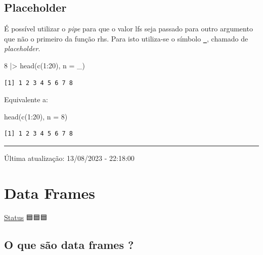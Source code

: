 \documentclass[
  letterpaper,
  DIV=11,
  numbers=noendperiod]{scrreprt}
\newenvironment{Shaded}{\begin{snugshade}}{\end{snugshade}}
\newcommand{\AttributeTok}[1]{\textcolor[rgb]{0.40,0.45,0.13}{#1}}
\newcommand{\DecValTok}[1]{\textcolor[rgb]{0.68,0.00,0.00}{#1}}
\newcommand{\FunctionTok}[1]{\textcolor[rgb]{0.28,0.35,0.67}{#1}}
\newcommand{\NormalTok}[1]{\textcolor[rgb]{0.00,0.23,0.31}{#1}}
\newcommand{\SpecialCharTok}[1]{\textcolor[rgb]{0.37,0.37,0.37}{#1}}
\begin{document}
\hypertarget{placeholder}{%
\section{Placeholder}\label{placeholder}}

É possível utilizar o \emph{pipe} para que o valor lfs seja passado para
outro argumento que não o primeiro da função rhs. Para isto utiliza-se o
símbolo \textbf{\texttt{\_}}, chamado de \emph{placeholder}.

\begin{Shaded}
\begin{Highlighting}[]
\DecValTok{8} \SpecialCharTok{|\textgreater{}} \FunctionTok{head}\NormalTok{(}\FunctionTok{c}\NormalTok{(}\DecValTok{1}\SpecialCharTok{:}\DecValTok{20}\NormalTok{), }\AttributeTok{n =}\NormalTok{ \_)}
\end{Highlighting}
\end{Shaded}

\begin{verbatim}
[1] 1 2 3 4 5 6 7 8
\end{verbatim}

Equivalente a:

\begin{Shaded}
\begin{Highlighting}[]
\FunctionTok{head}\NormalTok{(}\FunctionTok{c}\NormalTok{(}\DecValTok{1}\SpecialCharTok{:}\DecValTok{20}\NormalTok{), }\AttributeTok{n =} \DecValTok{8}\NormalTok{)}
\end{Highlighting}
\end{Shaded}

\begin{verbatim}
[1] 1 2 3 4 5 6 7 8
\end{verbatim}

\begin{center}\rule{0.5\linewidth}{0.5pt}\end{center}

Última atualização: 13/08/2023 - 22:18:00

\hypertarget{data-frames}{%
\chapter{Data Frames}\label{data-frames}}

\protect\hyperlink{status-do-material}{Status} 🟦🟦🟦

\hypertarget{o-que-suxe3o-data-frames}{%
\section{O que são data frames ?}\label{o-que-suxe3o-data-frames}}
\end{document}

